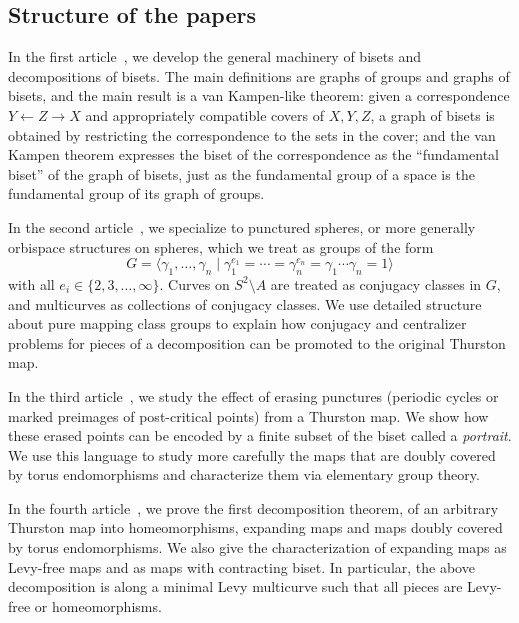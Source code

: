 \documentclass{amsart}
\begin{document}
\subsection{Structure of the papers}
In the first article~\cite{bartholdi-dudko:bc1}, we develop the
general machinery of bisets and decompositions of bisets. The main
definitions are graphs of groups and graphs of bisets, and the main
result is a van Kampen-like theorem: given a correspondence
$Y\leftarrow Z\to X$ and appropriately compatible covers of $X,Y,Z$, a
graph of bisets is obtained by restricting the correspondence to the
sets in the cover; and the van Kampen theorem expresses the biset of
the correspondence as the ``fundamental biset'' of the graph of
bisets, just as the fundamental group of a space is the fundamental
group of its graph of groups.

In the second article~\cite{bartholdi-dudko:bc2}, we specialize to
punctured spheres, or more generally orbispace structures on spheres,
which we treat as groups of the form
\[G=\langle \gamma_1,\dots,\gamma_n\mid
\gamma_1^{e_1}=\cdots=\gamma_n^{e_n}=\gamma_1\cdots\gamma_n=1\rangle
\]
with all $e_i\in\{2,3,\dots,\infty\}$. Curves on $S^2\setminus A$ are
treated as conjugacy classes in $G$, and multicurves as collections of
conjugacy classes. We use detailed structure about pure mapping class
groups to explain how conjugacy and centralizer problems for pieces of
a decomposition can be promoted to the original Thurston map.

In the third article~\cite{bartholdi-dudko:bc3}, we study the effect
of erasing punctures (periodic cycles or marked preimages of
post-critical points) from a Thurston map. We show how these erased
points can be encoded by a finite subset of the biset called a
\emph{portrait}. We use this language to study more carefully the maps
that are doubly covered by torus endomorphisms and characterize them
via elementary group theory.

In the fourth article~\cite{bartholdi-dudko:bc4}, we prove the first
decomposition theorem, of an arbitrary Thurston map into
homeomorphisms, expanding maps and maps doubly covered by torus
endomorphisms. We also give the characterization of expanding maps as
Levy-free maps and as maps with contracting biset. In particular, the
above decomposition is along a minimal Levy multicurve such that all
pieces are Levy-free or homeomorphisms.
\end{document}
